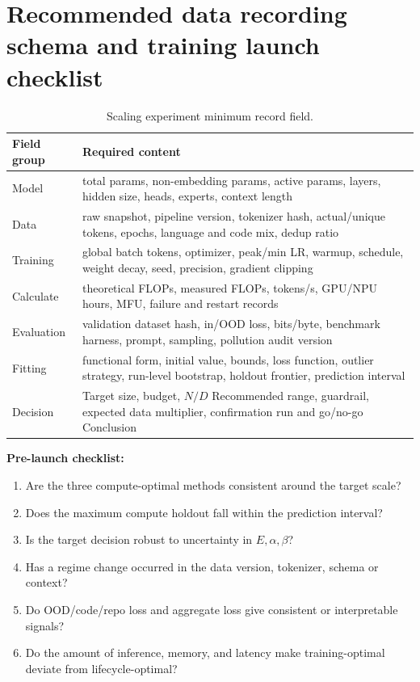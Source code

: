 \documentclass[UTF8,10pt,a4paper,fontset=none]{ctexart}
\begin{document}
\clearpage
\section{Recommended data recording schema and training launch checklist}
\label{en:app:schema}

\begin{table}[htbp]
\centering
\caption{Scaling experiment minimum record field. }\label{en:tab:schema}
\begin{tabularx}{\textwidth}{p{4.0cm}X}
\toprule
Field group & Required content \\
\midrule
Model & total params, non-embedding params, active params, layers, hidden size, heads, experts, context length \\
Data & raw snapshot, pipeline version, tokenizer hash, actual/unique tokens, epochs, language and code mix, dedup ratio \\
Training & global batch tokens, optimizer, peak/min LR, warmup, schedule, weight decay, seed, precision, gradient clipping \\
Calculate & theoretical FLOPs, measured FLOPs, tokens/s, GPU/NPU hours, MFU, failure and restart records \\
Evaluation & validation dataset hash, in/OOD loss, bits/byte, benchmark harness, prompt, sampling, pollution audit version \\
Fitting & functional form, initial value, bounds, loss function, outlier strategy, run-level bootstrap, holdout frontier, prediction interval \\
Decision & Target size, budget, $N/D$ Recommended range, guardrail, expected data multiplier, confirmation run and go/no-go Conclusion \\
\bottomrule
\end{tabularx}
\end{table}

\noindent\textbf{Pre-launch checklist:}
\begin{enumerate}
\item Are the three compute-optimal methods consistent around the target scale?
\item Does the maximum compute holdout fall within the prediction interval?
\item Is the target decision robust to uncertainty in $E,\alpha,\beta$?
\item Has a regime change occurred in the data version, tokenizer, schema or context?
\item Do OOD/code/repo loss and aggregate loss give consistent or interpretable signals?
\item Do the amount of inference, memory, and latency make training-optimal deviate from lifecycle-optimal?
\end{enumerate}
\end{document}
